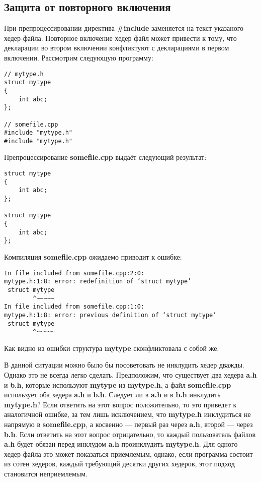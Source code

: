 \subsection{Защита от повторного включения}

При препроцессировании директива {\bf \#include} заменяется на текст указаного хедер-файла. Повторное включение хедер файл может привести к тому, что декларации во втором включении конфликтуют с декларациями в первом включении. Рассмотрим следующую программу:
\begin{verbatim}
// mytype.h
struct mytype
{
    int abc;
};

// somefile.cpp
#include "mytype.h"
#include "mytype.h"
\end{verbatim}

Препроцессирование {\bf somefile.cpp} выдаёт следующий результат:
\begin{verbatim}
struct mytype
{
    int abc;
};

struct mytype
{
    int abc;
};
\end{verbatim}

Компиляция {\bf somefile.cpp} ожидаемо приводит к ошибке:

\begin{verbatim}
In file included from somefile.cpp:2:0:
mytype.h:1:8: error: redefinition of ‘struct mytype’
 struct mytype
        ^~~~~~
In file included from somefile.cpp:1:0:
mytype.h:1:8: error: previous definition of ‘struct mytype’
 struct mytype
        ^~~~~~
\end{verbatim}

Как видно из ошибки структура {\bf mytype} сконфликтовала с собой же.

В данной ситуации можно было бы посоветовать не инклудить хедер дважды. Однако это не всегда легко сделать. Предположим, что существует два хедера {\bf a.h} и {\bf b.h}, которые используют {\bf mytype} из {\bf mytype.h}, а файл {\bf somefile.cpp} использует оба хедера {\bf a.h} и {\bf b.h}. Следует ли в {\bf a.h} и в {\bf b.h} инклудить {\bf mytype.h}? Если ответить на этот вопрос положительно, то это приведет к аналогичной ошибке, за тем лишь исключением, что {\bf mytype.h} инклудиться не напрямую в {\bf somefile.cpp}, а косвенно --- первый раз через {\bf a.h}, второй --- через {\bf b.h}. Если ответить на этот вопрос отрицательно, то каждый пользователь файлов {\bf a.h} будет обязан перед инклудом {\bf a.h} проинклудить {\bf mytype.h}. Для одного хедер-файла это может показаться приемлемым, однако, если программа состоит из сотен хедеров, каждый требующий десятки других хедеров, этот подход становится неприемлемым.

